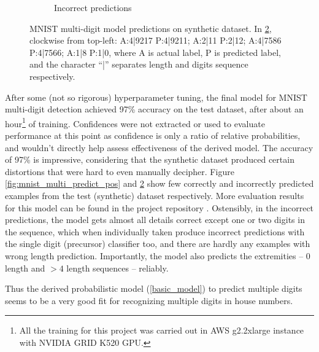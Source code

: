 \documentclass{article}
\begin{document}
\begin{figure}[h]
\begin{subfigure}[h]{0.4\textwidth}
			\caption{Incorrect predictions}
			\label{fig:mnist_multi_predict_neg}
		\end{subfigure}
		\caption{MNIST multi-digit model predictions on synthetic dataset. In \ref{fig:mnist_multi_predict_neg}, clockwise from top-left: A:4|9217 P:4|9211; A:2|11 P:2|12; A:4|7586 P:4|7566; A:1|8 P:1|0, where A is actual label, P is predicted label, and the character ``|'' separates length and digits sequence respectively.}
	\end{figure}
	
	After some (not so rigorous) hyperparameter tuning, the final model for MNIST multi-digit detection achieved 97\% accuracy on the test dataset, after about an hour\footnote{All the training for this project was carried out in AWS g2.2xlarge instance with NVIDIA GRID K520 GPU.} of training. Confidences were not extracted or used to evaluate performance at this point as confidence is only a ratio of relative probabilities, and wouldn't directly help assess effectiveness of the derived model. The accuracy of 97\% is impressive, considering that the synthetic dataset produced certain distortions that were hard to even manually decipher. Figure \ref{fig:mnist_multi_predict_pos} and \ref{fig:mnist_multi_predict_neg} show few correctly and incorrectly predicted examples from the test (synthetic) dataset respectively. More evaluation results for this model can be found in the project repository \cite{mnist-multi-eval}. Ostensibly, in the incorrect predictions, the model gets almost all details correct except one or two digits in the sequence, which when individually taken produce incorrect predictions with the single digit (precursor) classifier too, and there are hardly any examples with wrong length prediction. Importantly, the model also predicts the extremities -- 0 length and $ >4 $ length sequences -- reliably.
	
	Thus the derived probabilistic model (\ref{basic_model}) to predict multiple digits seems to be a very good fit for recognizing multiple digits in house numbers. 
	
\end{document}

